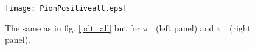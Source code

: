 \begin{figure}[!hbt]
\centering
		\texttt{[image: PionPositiveall.eps]}
	\caption{\label{pi_all}
		The same as in fig. \ref{pdt_all} but for $\pi^{+}$ (left panel) and $\pi^{-}$ (right panel).
	}
\end{figure}


